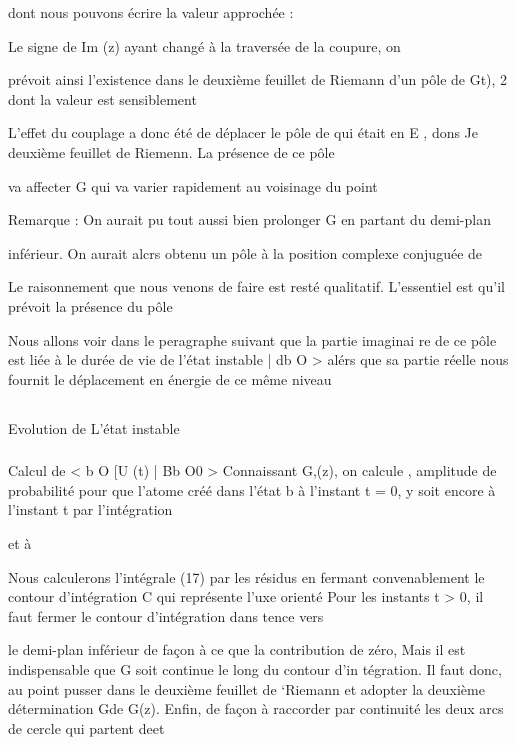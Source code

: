 dont nous pouvons écrire la valeur approchée :

Le signe de Im (z) ayant changé à la traversée de la coupure, on

prévoit ainsi l'existence dans le deuxième feuillet de Riemann d'un pôle de
Gt), 2 dont la valeur est sensiblement

L'effet du couplage a donc été de déplacer le pôle de 
qui était en E , dons Je deuxième feuillet de Riemenn. La présence de ce pôle

va affecter G  qui va varier rapidement au voisinage du point 

Remarque : On aurait pu tout aussi bien prolonger G  en partant du demi-plan

inférieur. On aurait alcrs obtenu un pôle à la position complexe conjuguée
de  
 
Le raisonnement que nous venons de faire est resté qualitatif.
L'essentiel est qu'il prévoit la présence du pôle 

Nous allons voir dans le peragraphe suivant que la partie imaginai
re de ce pôle est liée à le durée de vie de l'état instable | db O > alérs que
sa partie réelle nous fournit le déplacement en énergie de ce même niveau

\subsection{}Evolution de L'état instable%

\subsubsection{} Calcul de < b O [U (t) | Bb O0 >%
Connaissant G,(z), on calcule , amplitude de probabilité pour que l'atome créé dans l'état b à l'instant t = 0, y
soit encore à l'instant t par l'intégration

 et à

Nous calculerons l'intégrale (17) par les résidus en fermant convenablement le contour d'intégration C qui représente l'uxe orienté 
Pour les instants t > 0, il faut fermer le contour d'intégration dans
 tence vers

le demi-plan inférieur de façon à ce que la contribution de
zéro, Mais il est indispensable que G soit continue le long du contour d'in
tégration. Il faut donc, au point pusser dans le deuxième feuillet de
‘Riemann et adopter la deuxième détermination Gde G(z). Enfin, de façon à
raccorder par continuité les deux arcs de cercle qui partent deet

